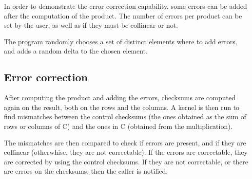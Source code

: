 In order to demonstrate the error correction capability, some errors can be added after the computation of the product.
The number of errors per product can be set by the user, as well as if they must be collinear or not.

The program randomly chooses a set of distinct elements where to add errors, and adds a random delta to the chosen element.

\subsection{Error correction}

After computing the product and adding the errors, checksums are computed again on the result, both on the rows and the columns.
A kernel is then run to find mismatches between the control checksums (the ones obtained as the sum of rows or columns of C) and the ones in C (obtained from the multiplication).

The mismatches are then compared to check if errors are present, and if they are collinear (otherwhise, they are not correctable).
If the errors are correctable, they are corrected by using the control checksums.
If they are not correctable, or there are errors on the checksums, then the caller is notified.

